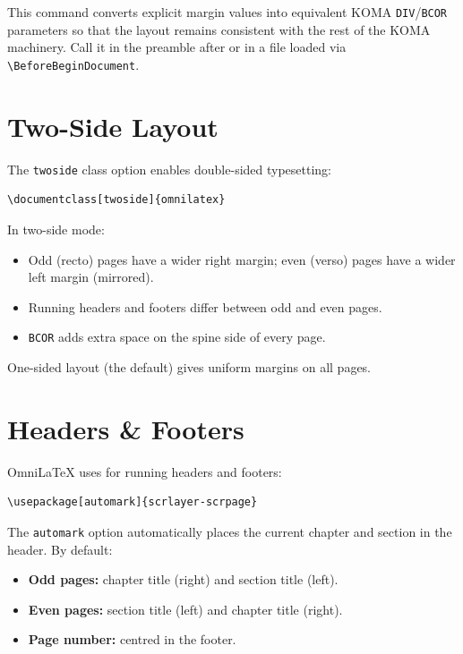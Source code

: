 This command converts explicit margin values into equivalent KOMA
\texttt{DIV}/\texttt{BCOR} parameters so that the layout remains
consistent with the rest of the KOMA machinery.  Call it in the preamble
after \verb|| or in a file loaded via
\verb|\BeforeBeginDocument|.

\section{Two-Side Layout}

The \texttt{twoside} class option enables double-sided typesetting:

\begin{verbatim}
\documentclass[twoside]{omnilatex}
\end{verbatim}

In two-side mode:
\begin{itemize}
  \item Odd (recto) pages have a wider right margin; even (verso) pages
        have a wider left margin (mirrored).
  \item Running headers and footers differ between odd and even pages.
  \item \texttt{BCOR} adds extra space on the spine side of every page.
\end{itemize}

One-sided layout (the default) gives uniform margins on all pages.

\section{Headers \& Footers}

OmniLaTeX uses  for running headers and footers:

\begin{verbatim}
\usepackage[automark]{scrlayer-scrpage}
\end{verbatim}

The \texttt{automark} option automatically places the current chapter and
section in the header.  By default:
\begin{itemize}
  \item \textbf{Odd pages:} chapter title (right) and section title
        (left).
  \item \textbf{Even pages:} section title (left) and chapter title
        (right).
  \item \textbf{Page number:} centred in the footer.
\end{itemize}

